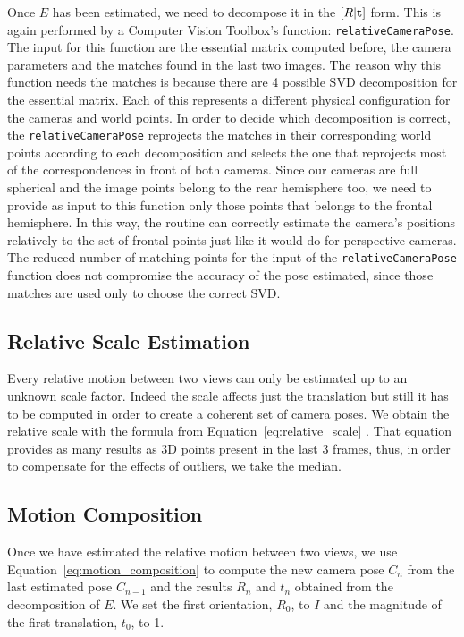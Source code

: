 Once $E$ has been estimated, we need to decompose it in the 
\( [R|\mathbf{t} ] \) form. This is again performed by a Computer Vision 
Toolbox's function: {\tt relativeCameraPose}.
The input for this function are the essential matrix computed before, the 
camera parameters and the matches found in the last two images.
The reason why this function needs the matches is because there are 4 possible 
SVD decomposition for the essential matrix. Each of this represents a 
different physical configuration for the cameras and world points.
In order to decide which decomposition is correct, the {\tt relativeCameraPose}
reprojects the matches in their corresponding world points according to each 
decomposition and selects the one that reprojects most of the correspondences in 
front of both cameras.
Since our cameras are full spherical and the image points belong to the 
rear hemisphere too, we need to provide as input to this function only 
those points that belongs to the frontal hemisphere. In this way, the routine 
can correctly estimate the camera's positions relatively to the set of frontal
points just like it would do for perspective cameras.
The reduced number of matching points for the input of the 
{\tt relativeCameraPose} function does not compromise the accuracy of the pose 
estimated, since those matches are used only to choose the 
correct SVD.

\subsection{Relative Scale Estimation}
Every relative motion between two views can only be estimated up to an unknown 
scale factor. Indeed the scale affects just the translation but still it has to 
be computed in order to create a coherent set of camera poses.
We obtain the relative scale with the formula from 
Equation~\ref{eq:relative_scale} \cite{scaramuzzaVisualOdometryI}.
That equation provides as many results as 3D points present in the last 3 
frames, thus, in order to compensate for the effects of outliers, we take the 
median.

\subsection{Motion Composition}
Once we have estimated the relative motion between two views, we use 
Equation~\ref{eq:motion_composition} to compute the new camera pose $C_n$ from 
the last estimated pose $C_{n-1}$ and the results $R_{n}$ and $t_n$ obtained 
from the decomposition of $E$.
We set the first orientation, $R_0$, to $I$ and the magnitude of the first 
translation, $t_0$, to 1.

